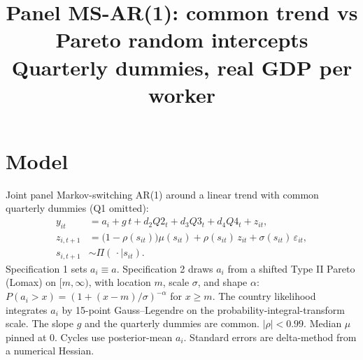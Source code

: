 \documentclass[11pt]{article}
\title{Panel MS-AR(1): common trend vs Pareto random intercepts\\[0.4em]\large Quarterly dummies, real GDP per worker}
\author{}
\date{}
\begin{document}
\maketitle
\section{Model}
Joint panel Markov-switching AR(1) around a linear trend with common quarterly dummies (Q1 omitted):
\begin{align}
y_{it} &= a_i + g\, t + d_2 Q2_t + d_3 Q3_t + d_4 Q4_t + z_{it}, \\
z_{i,t+1} &= \bigl(1-\rho(s_{it})\bigr)\mu(s_{it}) + \rho(s_{it})\, z_{it} + \sigma(s_{it})\,\varepsilon_{it}, \\
s_{i,t+1} &\sim \Pi(\,\cdot\mid s_{it}).
\end{align}
Specification 1 sets $a_i\equiv a$. Specification 2 draws $a_i$ from a shifted Type II Pareto (Lomax) on $[m,\infty)$, with location $m$, scale $\sigma$, and shape $\alpha$: $P(a_i>x)=(1+(x-m)/\sigma)^{-\alpha}$ for $x\ge m$. The country likelihood integrates $a_i$ by 15-point Gauss--Legendre on the probability-integral-transform scale. The slope $g$ and the quarterly dummies are common. $|\rho|<0.99$. Median $\mu$ pinned at 0. Cycles use posterior-mean $a_i$. Standard errors are delta-method from a numerical Hessian.
\clearpage
\end{document}

